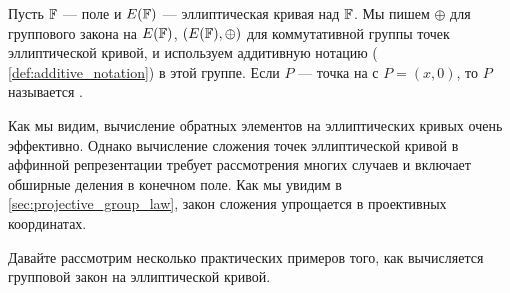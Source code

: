 \begin{notation}
Пусть $\mathbb{F}$ — поле и $E(\mathbb{F})$ — эллиптическая кривая над $\mathbb{F}$. Мы пишем $\oplus$ для группового закона на $E(\mathbb{F})$, $(E(\mathbb{F}),\oplus)$ для коммутативной группы точек эллиптической кривой, и используем аддитивную нотацию (\notationname{} \ref{def:additive_notation}) в этой группе. Если $P$ — точка на  с $P=(x,0)$, то $P$ называется .
\end{notation}
Как мы видим, вычисление обратных элементов на эллиптических кривых очень эффективно. Однако вычисление сложения точек эллиптической кривой в аффинной репрезентации требует рассмотрения многих случаев и включает обширные деления в конечном поле. Как мы увидим в \ref{sec:projective_group_law}, закон сложения упрощается в проективных координатах.

Давайте рассмотрим несколько практических примеров того, как вычисляется групповой закон на эллиптической кривой.

